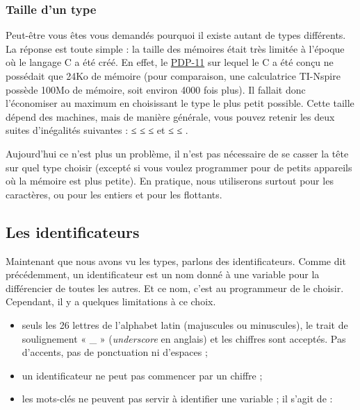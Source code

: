 {\subsubsection{Taille d'un type}
\label{taille-dun-type}

Peut-être vous êtes vous demandés pourquoi il existe autant de types
différents. La réponse est toute simple : la taille des mémoires était
très limitée à l'époque où le langage C a été créé. En effet, le
\href{https://upload.wikimedia.org/wikipedia/commons/c/c4/80_early_pcp_2.jpg}{PDP-11}
sur lequel le C a été conçu ne possédait que 24Ko de mémoire (pour
comparaison, une calculatrice TI-Nspire possède 100Mo de mémoire, soit
environ 4000 fois plus). Il fallait donc l'économiser au maximum en
choisissant le type le plus petit possible. Cette taille dépend des
machines, mais de manière générale, vous pouvez retenir les deux suites
d'inégalités suivantes :  ≤  ≤  ≤
 et  ≤  ≤
.

Aujourd'hui ce n'est plus un problème, il n'est pas nécessaire de se
casser la tête sur quel type choisir (excepté si vous voulez programmer
pour de petits appareils où la mémoire est plus petite). En pratique,
nous utiliserons surtout  pour les caractères, 
ou  pour les entiers et  pour les flottants.

\subsection{Les identificateurs}
\label{les-identificateurs}

Maintenant que nous avons vu les types, parlons des identificateurs.
Comme dit précédemment, un identificateur est un nom donné à une
variable pour la différencier de toutes les autres. Et ce nom, c'est
au programmeur de le choisir. Cependant, il y a quelques limitations à
ce choix.

\begin{itemize}
\item seuls les 26 lettres de l'alphabet latin (majuscules ou
  minuscules), le trait de soulignement « \_ » (\emph{underscore} en
  anglais) et les chiffres sont acceptés. Pas d'accents, pas de
  ponctuation ni d'espaces ;
\item
  un identificateur ne peut pas commencer par un chiffre ;
\item
  les mots-clés ne peuvent pas servir à identifier une variable ; il
  s'agit de :
\end{itemize}

}
